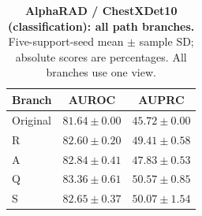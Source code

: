 \begin{table}[tp]
\centering
\caption{\textbf{AlphaRAD / ChestXDet10 (classification): all path branches.} Five-support-seed mean $\pm$ sample SD; absolute scores are percentages. All branches use one view.}
\label{tab:supp-path-chestxdet10}
\small
\setlength{\tabcolsep}{4pt}
\begin{tabular*}{\textwidth}{@{\extracolsep{\fill}}lcc@{}}
\toprule
Branch & AUROC & AUPRC \\
\midrule
Original & $81.64\pm0.00$ & $45.72\pm0.00$ \\
R & $82.60\pm0.20$ & $49.41\pm0.58$ \\
A & $82.84\pm0.41$ & $47.83\pm0.53$ \\
Q & $83.36\pm0.61$ & $50.57\pm0.85$ \\
S & $82.65\pm0.37$ & $50.07\pm1.54$ \\
\bottomrule
\end{tabular*}
\end{table}
